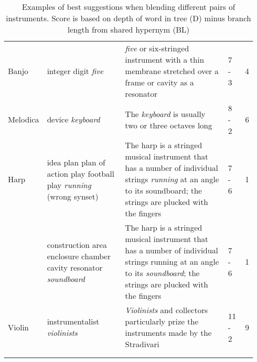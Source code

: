 \begin{table}
	\caption{Examples of best suggestions when blending different pairs of instruments. Score is based on depth of word in tree (D) minus branch length from shared hypernym (BL)}
	\label{tab:topscoringexamples}
	\centering
	\begin{tabular}{l p{30mm} p{30mm} l l}
		\toprule
		\tabhead{Instrument} & \tabhead{Top scoring branch} & \tabhead{Context} & \tabhead{D - BL} & \tabhead{Score} \\
		\midrule
		Banjo &
		integer \newline
		digit \newline
		\emph{five} & \emph{five} or six-stringed instrument with a thin membrane stretched over a frame or cavity as a resonator & 7 - 3 & 4	\\
		Melodica &
		device \newline 
		\emph{keyboard} &
		The \emph{keyboard} is usually two or three octaves long & 8 - 2 &	6
		\\
		\midrule
		Harp &
		idea \newline
		plan \newline
		plan of action \newline
		play \newline
		football play \newline
		\emph{running} \newline
		(wrong synset) & The harp is a stringed musical instrument that has a number of individual strings \emph{running} at an angle to its soundboard; the strings are plucked with the fingers & 7 - 6 & 1	\\
		 &
		construction \newline
		area \newline
		enclosure \newline
		chamber \newline
		cavity resonator \newline
		\emph{soundboard} &
		The harp is a stringed musical instrument that has a number of individual strings running at an angle to its \emph{soundboard}; the strings are plucked with the fingers & 7 - 6 &	1 \\
		Violin &
		instrumentalist \newline
		\emph{violinists} & \emph{Violinists} and collectors particularly prize the instruments made by the Stradivari & 11 - 2 & 9	\\
		\\
		\bottomrule\\
	\end{tabular}
\end{table}

